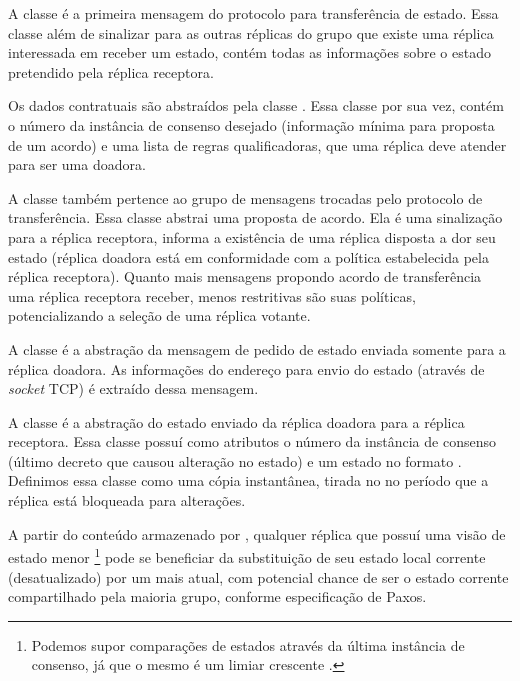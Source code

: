 A classe  é a primeira mensagem do protocolo para transferência
de estado. Essa classe além de sinalizar para as outras réplicas do grupo que existe uma
réplica interessada em receber um estado, contém todas as informações sobre o estado
pretendido pela réplica receptora.

Os dados contratuais são abstraídos pela classe . Essa classe por sua
vez, contém o número da instância de consenso desejado (informação mínima para proposta de
um acordo) e uma lista de regras qualificadoras, que uma réplica deve atender para ser uma
doadora.


A classe  também pertence ao grupo de mensagens trocadas pelo
protocolo de transferência. Essa classe abstrai uma proposta de acordo. Ela é uma
sinalização para a réplica receptora, informa a existência de uma réplica disposta a dor
seu estado (réplica doadora está em conformidade com a política estabelecida pela réplica
receptora). Quanto mais mensagens propondo acordo de transferência uma réplica receptora
receber, menos restritivas são suas políticas, potencializando a seleção de uma réplica
votante.


A classe  é a abstração da mensagem de pedido de estado enviada
somente para a réplica doadora. As informações do endereço para envio do estado (através
de \emph{socket} TCP) é extraído dessa mensagem.


A classe  é a abstração do estado enviado da réplica doadora para
a réplica receptora. Essa classe possuí como atributos o número da instância de consenso
(último decreto que causou alteração no estado) e um estado no formato
. Definimos essa classe como uma cópia instantânea, tirada
no no período que a réplica está bloqueada para alterações.

A partir do conteúdo armazenado por , qualquer réplica que possuí
uma visão de estado menor \footnote{Podemos supor comparações de estados através da última
instância de consenso, já que o mesmo é um limiar crescente \cite{vieira-tr10b}.} pode se
beneficiar da substituição de seu estado local corrente (desatualizado) por um mais atual,
com potencial chance de ser o estado corrente compartilhado pela maioria grupo, conforme
especificação de Paxos.

